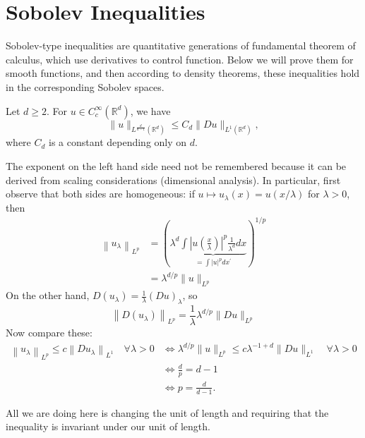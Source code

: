 \section{Sobolev Inequalities}
Sobolev-type inequalities are quantitative generations of fundamental theorem of calculus, 
which use derivatives to control function. Below we will prove them for smooth functions, and 
then according to density theorems, these inequalities hold in the corresponding Sobolev spaces.

\begin{theorem}
Let $d \geq 2$. For $u \in C_{c}^{\infty}\left(\mathbb{R}^{d}\right)$, we have
$$
\|u\|_{L^{\frac{d}{d-1}}\left(\mathbb{R}^{d}\right)} \leq C_{d}\|D u\|_{L^{1}\left(\mathbb{R}^{d}\right)},
$$
where $C_{d}$ is a constant depending only on $d$.
\end{theorem}

\begin{remark}
    The exponent on the left hand side need not be remembered because it can be derived from scaling considerations (dimensional analysis). In particular, first observe that both sides are homogeneous: if $u \mapsto u_{\lambda}(x)=u(x / \lambda)$ for $\lambda>0$, then
    $$
    \begin{aligned}
    \left\|u_{\lambda}\right\|_{L^{p}} &=(\lambda^{d} \underbrace{\int\left|u\left(\frac{x}{\lambda}\right)\right|^{p} \frac{1}{\lambda^{d}} d x}_{=\int|u|^{p} d x^{\prime}})^{1 / p} \\
    &=\lambda^{d / p}\|u\|_{L^{p}}
    \end{aligned}
    $$
    On the other hand, $D\left(u_{\lambda}\right)=\frac{1}{\lambda}(D u)_{\lambda}$, so
    $$
    \left\|D\left(u_{\lambda}\right)\right\|_{L^{p}}=\frac{1}{\lambda} \lambda^{d / p}\|D u\|_{L^{p}}
    $$
    Now compare these:
    $$
    \begin{aligned}
    \left\|u_{\lambda}\right\|_{L^{p}} \leq c\left\|D u_{\lambda}\right\|_{L^{1}} \quad \forall \lambda>0 & \Longleftrightarrow \lambda^{d / p}\|u\|_{L^{p}} \leq c \lambda^{-1+d}\|D u\|_{L^{1}} \quad \forall \lambda>0 \\
    & \Longleftrightarrow \frac{d}{p}=d-1 \\
    & \Longleftrightarrow p=\frac{d}{d-1} .
    \end{aligned}
    $$
\end{remark}
All we are doing here is changing the unit of length and requiring that the inequality is invariant under our unit of length.

